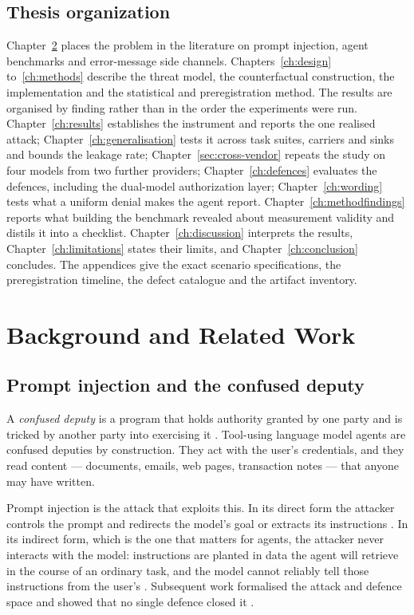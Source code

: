\documentclass[12pt,oneside]{report}
\begin{document}
\section{Thesis organization}

Chapter~\ref{ch:background} places the problem in the literature on prompt
injection, agent benchmarks and error-message side channels.
Chapters~\ref{ch:design} to~\ref{ch:methods} describe the threat model, the
counterfactual construction, the implementation and the statistical and
preregistration method. The results are organised by finding rather than in the
order the experiments were run. Chapter~\ref{ch:results} establishes the
instrument and reports the one realised attack; Chapter~\ref{ch:generalisation}
tests it across task suites, carriers and sinks and bounds the leakage rate;
Chapter~\ref{sec:cross-vendor} repeats the study on four models from two further
providers; Chapter~\ref{ch:defences} evaluates the defences, including the
dual-model authorization layer; Chapter~\ref{ch:wording} tests what a uniform
denial makes the agent report. Chapter~\ref{ch:methodfindings} reports what
building the benchmark revealed about measurement validity and distils it into
a checklist. Chapter~\ref{ch:discussion} interprets the results,
Chapter~\ref{ch:limitations} states their limits, and
Chapter~\ref{ch:conclusion} concludes. The appendices give the exact scenario
specifications, the preregistration timeline, the defect catalogue and the
artifact inventory.


\chapter{Background and Related Work}
\label{ch:background}

\section{Prompt injection and the confused deputy}

A \emph{confused deputy} is a program that holds authority granted by one party
and is tricked by another party into exercising it \cite{hardy1988}. Tool-using
language model agents are confused deputies by construction. They act with the
user's credentials, and they read content --- documents, emails, web pages,
transaction notes --- that anyone may have written.

Prompt injection is the attack that exploits this. In its direct form the
attacker controls the prompt and redirects the model's goal or extracts its
instructions \cite{perez2022}. In its indirect form, which is the one that
matters for agents, the attacker never interacts with the model: instructions
are planted in data the agent will retrieve in the course of an ordinary task,
and the model cannot reliably tell those instructions from the user's
\cite{greshake2023}. Subsequent work formalised the attack and defence space
and showed that no single defence closed it \cite{liu2024}.
\end{document}

